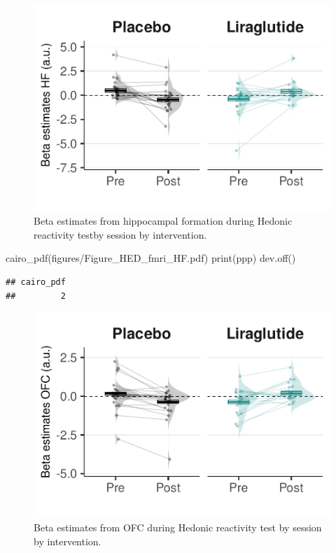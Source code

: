 \documentclass[
]{article}
\newenvironment{Shaded}{\begin{snugshade}}{\end{snugshade}}
\newcommand{\FunctionTok}[1]{\textcolor[rgb]{0.00,0.00,0.00}{#1}}
\newcommand{\NormalTok}[1]{#1}
\newcommand{\StringTok}[1]{\textcolor[rgb]{0.31,0.60,0.02}{#1}}
\begin{document}
\begin{figure}

\hfill{}\includegraphics{OBIWAN_LIRA_files/figure-latex/HED_fmri_plot_HF-1} 

\caption{Beta estimates from hippocampal formation during Hedonic reactivity testby session by intervention.}\label{fig:HED_fmri_plot_HF}
\end{figure}

\begin{Shaded}
\begin{Highlighting}[]
\FunctionTok{cairo\_pdf}\NormalTok{(}\StringTok{\textquotesingle{}figures/Figure\_HED\_fmri\_HF.pdf\textquotesingle{}}\NormalTok{)}
\FunctionTok{print}\NormalTok{(ppp)}
\FunctionTok{dev.off}\NormalTok{()}
\end{Highlighting}
\end{Shaded}

\begin{verbatim}
## cairo_pdf 
##         2
\end{verbatim}

\begin{figure}

\hfill{}\includegraphics{OBIWAN_LIRA_files/figure-latex/HED_fmri_plot_OFC-1} 

\caption{Beta estimates from OFC during Hedonic reactivity test by session by intervention.}\label{fig:HED_fmri_plot_OFC}
\end{figure}
\end{document}
